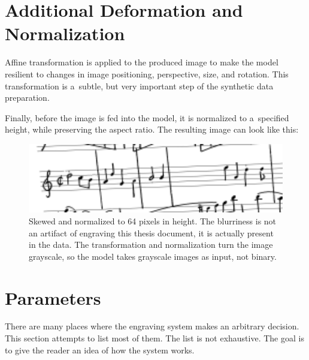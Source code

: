\section{Additional Deformation and Normalization}

Affine transformation is applied to the produced image to make the model resilient to changes in image positioning, perspective, size, and rotation. This transformation is a~subtle, but very important step of the synthetic data preparation.

Finally, before the image is fed into the model, it is normalized to a~specified height, while preserving the aspect ratio. The resulting image can look like this:

\begin{figure}[h]
    \centering
    \includegraphics[width=120mm]{../img/normalized-image}
    \caption{Skewed and normalized to 64 pixels in height. The blurriness is not an artifact of engraving this thesis document, it is actually present in the data. The transformation and normalization turn the image grayscale, so the model takes grayscale images as input, not binary.}
    \label{fig5:NormalizedImage}
\end{figure}


\section{Parameters}

There are many places where the engraving system makes an arbitrary decision. This section attempts to list most of them. The list is not exhaustive. The goal is to give the reader an idea of how the system works.

